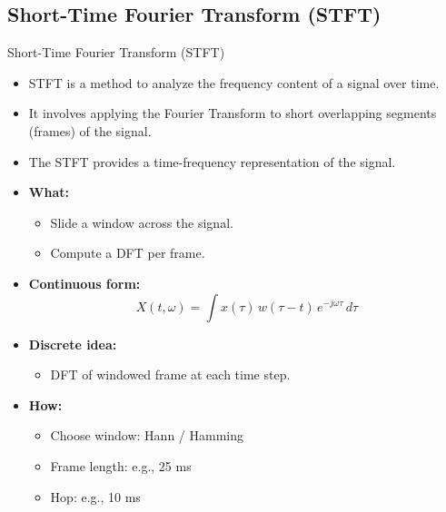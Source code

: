 \subsection{Short-Time Fourier Transform (STFT)}
\begin{frame}[allowframebreaks]{Short-Time Fourier Transform (STFT)}
    \begin{itemize}
        \item STFT is a method to analyze the frequency content of a signal over time.
        \item It involves applying the Fourier Transform to short overlapping segments (frames) of the signal.
        \item The STFT provides a time-frequency representation of the signal.
    \end{itemize}
\framebreak
    \begin{itemize}
        \item \textbf{What:}
        \begin{itemize}
            \item Slide a window across the signal.
            \item Compute a DFT per frame.
        \end{itemize}

        \item \textbf{Continuous form:}
        \[
            X(t,\omega) = \int x(\tau)\, w(\tau - t)\, e^{-j \omega \tau}\, d\tau
        \]

        \item \textbf{Discrete idea:}
        \begin{itemize}
            \item DFT of windowed frame at each time step.
        \end{itemize}
\framebreak
        \item \textbf{How:}
        \begin{itemize}
            \item Choose window: Hann / Hamming
            \item Frame length: e.g., 25 ms
            \item Hop: e.g., 10 ms
        \end{itemize}


\end{itemize}
\end{frame}
